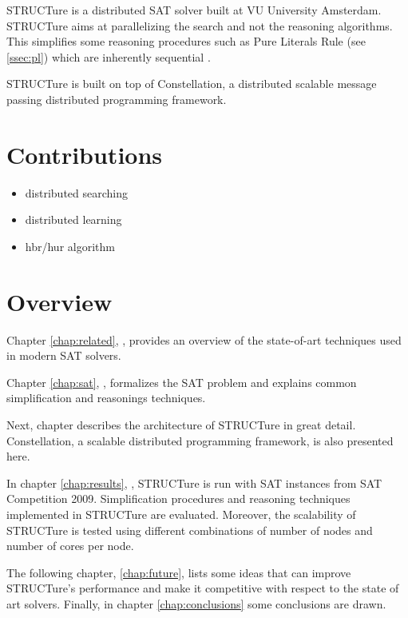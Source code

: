 STRUCTure is a distributed SAT solver built at VU University
Amsterdam.  STRUCTure aims at parallelizing the search and not the
reasoning algorithms. This simplifies some reasoning procedures
such as Pure Literals Rule (see \ref{ssec:pl}) which are inherently
sequential \cite{Johannsen:2005:CPL:1166822.1166834}.

STRUCTure is built on top of Constellation, a distributed
scalable message passing distributed programming framework.


\section{Contributions}

\begin{itemize}
  \item distributed searching
  \item distributed learning
  \item hbr/hur algorithm
\end{itemize}

\section{Overview}

Chapter \ref{chap:related}, , provides an
overview of the state-of-art techniques used in modern SAT solvers.

Chapter \ref{chap:sat}, , formalizes the SAT
problem and explains common simplification and reasonings techniques.

Next, chapter  describes the architecture
of STRUCTure in great detail. Constellation, a scalable distributed
programming framework, is also presented here.

In chapter \ref{chap:results}, , STRUCTure is
run with SAT instances from SAT Competition 2009. Simplification
procedures and reasoning techniques implemented in STRUCTure are
evaluated. Moreover, the scalability of STRUCTure is tested
using different combinations of number of nodes and number of cores
per node.

The following chapter, \ref{chap:future}, lists some ideas that can
improve STRUCTure's performance and make it competitive with respect
to the state of art solvers. Finally, in chapter \ref{chap:conclusions}
some conclusions are drawn.
